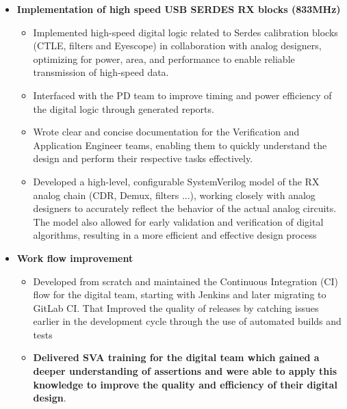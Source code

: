 \begin{cventries}
{\begin{cvitems}
\begin{itemize}
\begin{itemize}
            \item {Setup and configured the C toolchain in the simulation environment, enabling efficient and accurate testing and validation of designs.}
            \item {Effectively interfaced with external Design Verification (DV) contractors to ensure seamless integration of their deliverables into the project, resulting in successful project completion.}
          \end{itemize}
          \item {\textbf{Implementation of high speed USB SERDES RX blocks (833MHz)}}
          \begin{itemize}
            \item {Implemented high-speed digital logic related to Serdes calibration blocks (CTLE, filters and Eyescope) in collaboration with analog designers, optimizing for power, area, and performance to enable reliable transmission of high-speed data.}
            \item {Interfaced with the PD team to improve timing and power efficiency of the digital logic through generated reports.}
            \item {Wrote clear and concise documentation for the Verification and Application Engineer teams, enabling them to quickly understand the design and perform their respective tasks effectively.}
            \item {Developed a high-level, configurable SystemVerilog model of the RX analog chain (CDR, Demux, filters ...), working closely with analog designers to accurately reflect the behavior of the actual analog circuits. The model also allowed for early validation and verification of digital algorithms, resulting in a more efficient and effective design process}
          \end{itemize}
          \item {\textbf{Work flow improvement}}
          \begin{itemize}
            \item {Developed from scratch and maintained the Continuous Integration (CI) flow for the digital team, starting with Jenkins and later migrating to GitLab CI. That Improved the quality of releases by catching issues earlier in the development cycle through the use of automated builds and tests}
            \item {\textbf{Delivered SVA training for the digital team which gained a deeper understanding of assertions and were able to apply this knowledge to improve the quality and efficiency of their digital design}.}

\end{itemize}
\end{itemize}
\end{cvitems}}
\end{cventries}
